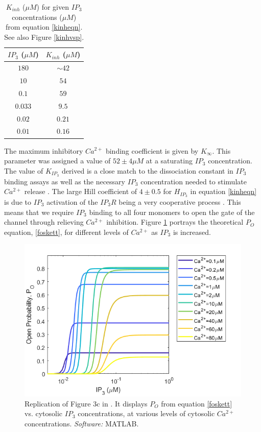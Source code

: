 \begin{table}[h!!!t!!!b!!!p]
\begin{center}
\begin{tabular}{ c c }
$IP_3$ ($\mu M$) & $K_{inh}$ ($\mu M$)\\
\hline
$180$ & $\sim 42$\\
\hline
$10$ & $54$\\
\hline
$0.1$ & $59$\\
\hline
$0.033$ & $9.5$\\
\hline
$0.02$ & $0.21$\\
\hline
$0.01$ & $0.16$\\
\end{tabular}
\end{center}
\caption{$K_{inh}$ ($\mu M$) for given $IP_3$ concentrations ($\mu M$) from equation \eqref{kinheqn}. See also Figure \ref{kinhvsp}.}\label{foskettkinhip3}
\end{table}

The maximum inhibitory $Ca^{2+}$ binding coefficient is given by $K_{\infty}$. This parameter was assigned a value of $52 \pm 4 \mu M$ at a saturating $IP_3$ concentration. The value of $K_{IP_3}$ derived is a close match to the dissociation constant in $IP_3$ binding assays as well as the necessary $IP_3$ concentration needed to stimulate $Ca^{2+}$ release . The large Hill coefficient of $4 \pm 0.5$ for $H_{IP_3}$ in equation \eqref{kinheqn} is due to $IP_3$ activation of the $IP_3R$ being a very cooperative process . This means that we require $IP_3$ binding to all four monomers to open the gate of the channel through relieving $Ca^{2+}$ inhibition. Figure \ref{fig3c} portrays the theoretical $P_O$ equation, \eqref{foskett}, for different levels of $Ca^{2+}$ as $IP_3$ is increased.

\begin{figure}[h!!!t!!!b!!!p]
  \centering
  \includegraphics[width=0.8\linewidth]{Chapters/3_IP3R_dynamics/extras/fig3cfoskettmatlab.png}
  \caption{{Replication of Figure 3c in . It displays $P_O$ from equation \eqref{foskett} vs. cytosolic $IP_3$ concentrations, at various levels of cytosolic $Ca^{2+}$ concentrations. \textit{Software:} MATLAB.} }\label{fig3c}
\end{figure}

